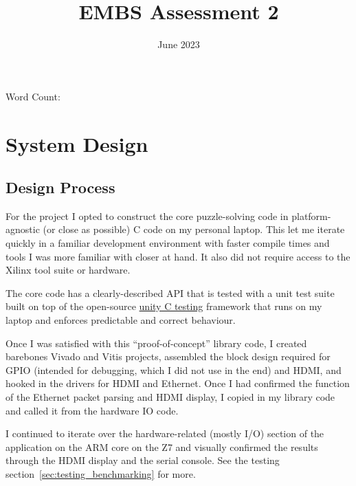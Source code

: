 \documentclass[11pt]{article}
\title{EMBS Assessment 2}
\author{}
\date{June 2023}
\begin{document}
\begin{titlepage}
\maketitle
Word Count: 
\tableofcontents
\end{titlepage}

\section{System Design}

\subsection{Design Process}

For the project I opted to construct the core puzzle-solving code in platform-agnostic (or close as possible) C code on my personal laptop.
This let me iterate quickly in a familiar development environment with faster compile times and tools I was more familiar with closer at hand.
It also did not require access to the Xilinx tool suite or hardware.

The core code has a clearly-described API that is tested with a unit test suite built on top of the open-source \href{https://github.com/ThrowTheSwitch/Unity}{unity C testing} framework that runs on my laptop and enforces predictable and correct behaviour.

Once I was satisfied with this ``proof-of-concept'' library code, I created barebones Vivado and Vitis projects, assembled the block design required for GPIO (intended for debugging, which I did not use in the end) and HDMI, and hooked in the drivers for HDMI and Ethernet.
Once I had confirmed the function of the Ethernet packet parsing and HDMI display, I copied in my library code and called it from the hardware IO code.

I continued to iterate over the hardware-related (mostly I/O) section of the application on the ARM core on the Z7 and visually confirmed the results through the HDMI display and the serial console. See the testing section~\ref{sec:testing_benchmarking} for more.

\end{document}
